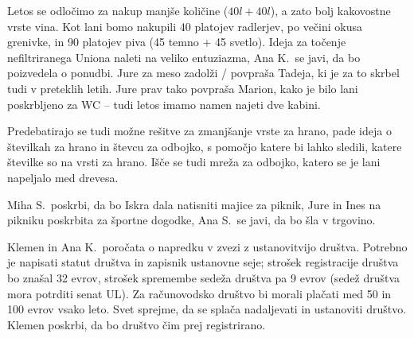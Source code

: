 \documentclass{seja}
\begin{document}
\begin{ad}
Letos se odločimo za nakup manjše količine ($40 l + 40 l$), a zato bolj kakovostne vrste vina. Kot lani bomo nakupili 40 platojev radlerjev, po večini okusa grenivke, in 90 platojev piva (45 temno + 45 svetlo). Ideja za točenje nefiltriranega Uniona naleti na veliko entuziazma, Ana K.~se javi, da bo poizvedela o ponudbi. Jure za meso zadolži / povpraša Tadeja, ki je za to skrbel tudi v preteklih letih. Jure prav tako povpraša Marion, kako je bilo lani poskrbljeno za WC -- tudi letos imamo namen najeti dve kabini.

Predebatirajo se tudi možne rešitve za zmanjšanje vrste za hrano, pade ideja o številkah za hrano in števcu za odbojko, s pomočjo katere bi lahko sledili, katere številke so na vrsti za hrano. Išče se tudi mreža za odbojko, katero se je lani napeljalo med drevesa.

Miha S.~poskrbi, da bo Iskra dala natisniti majice za piknik, Jure in Ines na pikniku poskrbita za športne dogodke, Ana S.~se javi, da bo šla v trgovino.

\item
Klemen in Ana K.~poročata o napredku v zvezi z ustanovitvijo društva. Potrebno je napisati statut društva in zapisnik ustanovne seje; strošek registracije društva bo znašal 32 evrov, strošek spremembe sedeža društva pa 9 evrov (sedež društva mora potrditi senat UL). Za računovodsko društvo bi morali plačati med 50 in 100 evrov vsako leto. Svet sprejme, da se splača nadaljevati in ustanoviti društvo. Klemen poskrbi, da bo društvo čim prej registrirano.

\end{ad}

\makeatletter \global\let\@enddocumenthook\@empty \makeatother
{}
\end{document}

